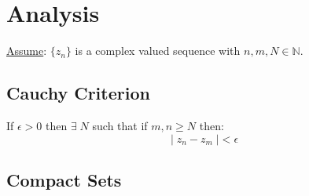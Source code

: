 \chapter{Analysis}
\underline{Assume}: $\{ {z}_{n} \}$ is a complex valued sequence with $n,m, N \in \mathbb{N}$.
\section{Cauchy Criterion}
\begin{defn}
	If $\epsilon > 0$ then $\exists \; N$ such that if $m, n \geq N$ then:
	\[|\; {z}_{n} - {z}_{m} \; | < \epsilon\]
\end{defn}

\section{Compact Sets}